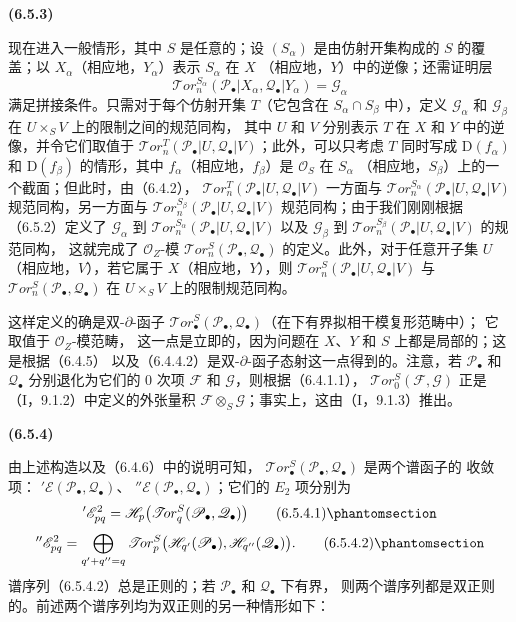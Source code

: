 \documentclass[UTF8,fontset=none,11pt,oneside,openany]{ctexbook}
\newenvironment{env}[1][]{%
  \par\medskip\noindent\textbf{(#1)}\ %
}{\par}
\let\EGAOriginalLabel\label
\renewcommand{\label}[1]{\phantomsection\EGAOriginalLabel{#1}}
\begin{document}
\begin{env}[6.5.3]
现在进入一般情形，其中 $S$ 是任意的；设 $(S_\alpha)$ 是由仿射开集构成的
$S$ 的覆盖；以 $X_\alpha$（相应地，$Y_\alpha$）表示 $S_\alpha$ 在 $X$
（相应地，$Y$）中的逆像；还需证明层
\[
  \mathscr{T}\!or_n^{S_\alpha}
  (\mathscr P_\bullet|X_\alpha,\mathscr Q_\bullet|Y_\alpha)
  =\mathscr G_\alpha
\]
满足拼接条件。只需对于每个仿射开集 $T$（它包含在 $S_\alpha\cap S_\beta$ 中），定义
$\mathscr G_\alpha$ 和 $\mathscr G_\beta$ 在 $U\times_S V$ 上的限制之间的规范同构，
其中 $U$ 和 $V$ 分别表示 $T$ 在 $X$ 和 $Y$ 中的逆像，并令它们取值于
$\mathscr{T}\!or_n^T(\mathscr P_\bullet|U,\mathscr Q_\bullet|V)$；此外，可以只考虑
$T$ 同时写成 $\mathrm D(f_\alpha)$ 和 $\mathrm D(f_\beta)$ 的情形，其中
$f_\alpha$（相应地，$f_\beta$）是 $\mathscr O_S$ 在 $S_\alpha$
（相应地，$S_\beta$）上的一个截面；但此时，由（6.4.2），
$\mathscr{T}\!or_n^T(\mathscr P_\bullet|U,\mathscr Q_\bullet|V)$ 一方面与
$\mathscr{T}\!or_n^{S_\alpha}(\mathscr P_\bullet|U,\mathscr Q_\bullet|V)$
规范同构，另一方面与
$\mathscr{T}\!or_n^{S_\beta}(\mathscr P_\bullet|U,\mathscr Q_\bullet|V)$
规范同构；由于我们刚刚根据（6.5.2）定义了 $\mathscr G_\alpha$ 到
$\mathscr{T}\!or_n^{S_\alpha}(\mathscr P_\bullet|U,\mathscr Q_\bullet|V)$ 以及
$\mathscr G_\beta$ 到
$\mathscr{T}\!or_n^{S_\beta}(\mathscr P_\bullet|U,\mathscr Q_\bullet|V)$ 的规范同构，
这就完成了 $\mathscr O_Z$-模
$\mathscr{T}\!or_n^S(\mathscr P_\bullet,\mathscr Q_\bullet)$ 的定义。此外，对于任意开子集
$U$（相应地，$V$），若它属于 $X$（相应地，$Y$），则
$\mathscr{T}\!or_n^S(\mathscr P_\bullet|U,\mathscr Q_\bullet|V)$ 与
$\mathscr{T}\!or_n^S(\mathscr P_\bullet,\mathscr Q_\bullet)$ 在
$U\times_S V$ 上的限制规范同构。

这样定义的确是双-$\partial$-函子
$\mathscr{T}\!or_\bullet^S(\mathscr P_\bullet,\mathscr Q_\bullet)$（在下有界拟相干模复形范畴中）；
它取值于 $\mathscr O_Z$-模范畴，
这一点是立即的，因为问题在 $X$、$Y$ 和 $S$ 上都是局部的；这是根据（6.4.5）
以及（6.4.4.2）是双-$\partial$-函子态射这一点得到的。注意，若
$\mathscr P_\bullet$ 和 $\mathscr Q_\bullet$ 分别退化为它们的 0 次项
$\mathscr F$ 和 $\mathscr G$，则根据（6.4.1.1），
$\mathscr{T}\!or_0^S(\mathscr F,\mathscr G)$ 正是（I，9.1.2）中定义的外张量积
$\mathscr F\otimes_S\mathscr G$；事实上，这由（I，9.1.3）推出。
\end{env}

\begin{env}[6.5.4]
由上述构造以及（6.4.6）中的说明可知，
$\mathscr{T}\!or_\bullet^S(\mathscr P_\bullet,\mathscr Q_\bullet)$ 是两个谱函子的
收敛项：
$'\mathscr E(\mathscr P_\bullet,\mathscr Q_\bullet)$、
$''\mathscr E(\mathscr P_\bullet,\mathscr Q_\bullet)$；它们的 $E_2$ 项分别为
\[
  '\mathscr E_{pq}^2
  =\mathscr H_p\bigl(\mathscr{T}\!or_q^S
    (\mathscr P_\bullet,\mathscr Q_\bullet)\bigr)
  \tag{6.5.4.1}\label{III.6.5.4.1-fr}
\]
\[
  ''\mathscr E_{pq}^2
  =\bigoplus_{q'+q''=q}
   \mathscr{T}\!or_p^S
   \bigl(\mathscr H_{q'}(\mathscr P_\bullet),
         \mathscr H_{q''}(\mathscr Q_\bullet)\bigr).
  \tag{6.5.4.2}\label{III.6.5.4.2-fr}
\]
谱序列（6.5.4.2）总是正则的；若 $\mathscr P_\bullet$ 和 $\mathscr Q_\bullet$ 下有界，
则两个谱序列都是双正则的。前述两个谱序列均为双正则的另一种情形如下：
\end{env}
\end{document}
